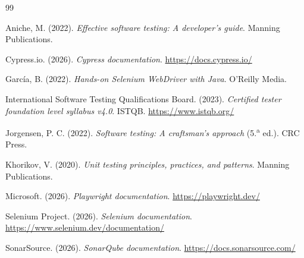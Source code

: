 \documentclass[12pt,a4paper]{article}
\begin{document}
\begin{thebibliography}{99}
\setlength{\itemsep}{0.4em}

Aniche, M. (2022). \textit{Effective software testing: A developer's guide}. Manning Publications.

Cypress.io. (2026). \textit{Cypress documentation}. \url{https://docs.cypress.io/}

García, B. (2022). \textit{Hands-on Selenium WebDriver with Java}. O'Reilly Media.

International Software Testing Qualifications Board. (2023). \textit{Certified tester foundation level syllabus v4.0}. ISTQB. \url{https://www.istqb.org/}

Jorgensen, P. C. (2022). \textit{Software testing: A craftsman's approach} (5.\textsuperscript{a} ed.). CRC Press.

Khorikov, V. (2020). \textit{Unit testing principles, practices, and patterns}. Manning Publications.

Microsoft. (2026). \textit{Playwright documentation}. \url{https://playwright.dev/}

Selenium Project. (2026). \textit{Selenium documentation}. \url{https://www.selenium.dev/documentation/}

SonarSource. (2026). \textit{SonarQube documentation}. \url{https://docs.sonarsource.com/}

\end{thebibliography}
\end{document}

